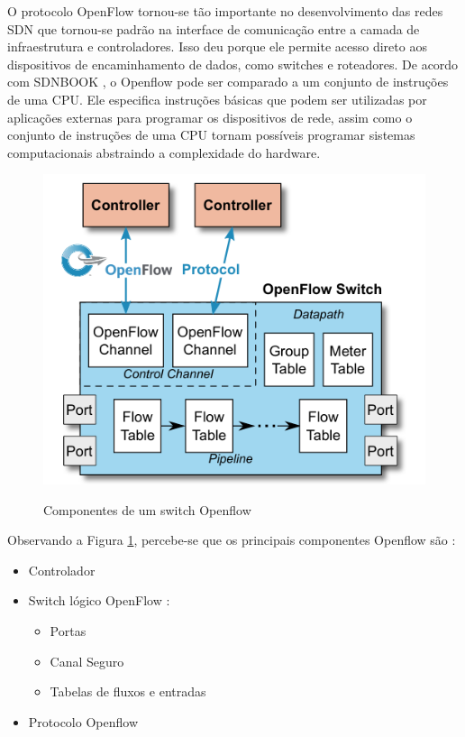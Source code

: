 O protocolo OpenFlow tornou-se tão importante no desenvolvimento das redes SDN que tornou-se padrão na interface de comunicação entre a camada de infraestrutura e controladores. Isso deu porque ele permite acesso direto aos dispositivos de encaminhamento de dados, como switches e roteadores. De acordo com SDNBOOK , o Openflow pode ser comparado a um conjunto de instruções de uma CPU. Ele especifica instruções básicas que podem ser utilizadas por aplicações externas para programar os dispositivos de rede, assim como o conjunto de instruções de uma CPU tornam possíveis programar sistemas computacionais abstraindo a complexidade do hardware.

\begin{figure}[!h]
    \caption{Componentes de um switch Openflow}
    \centering
    \includegraphics[scale=0.4]{Imagens/mainComponentesOpenflow.png}
    \label{mainComponents}
\end{figure}


Observando a Figura \ref{mainComponents}, percebe-se que os principais componentes Openflow são :

\begin{itemize}
    \item Controlador
    \item Switch lógico OpenFlow :
        \begin{itemize}
            \item Portas
            \item Canal Seguro
            \item Tabelas de fluxos e entradas
        \end{itemize}{}
    \item Protocolo Openflow
\end{itemize}{}


